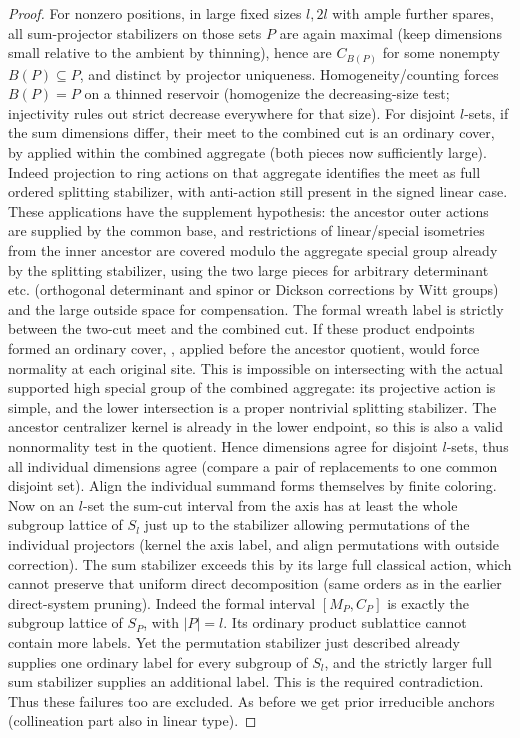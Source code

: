 \begin{proof}
For nonzero positions, in large fixed sizes \(l,2l\) with ample further spares, all sum-projector
stabilizers on those sets \(P\) are again maximal (keep dimensions small relative to the ambient by
thinning), hence are \(C_{B(P)}\) for some nonempty \(B(P)\subseteq P\), and distinct by projector
uniqueness. Homogeneity/counting forces \(B(P)=P\) on a thinned reservoir (homogenize the decreasing-size
test; injectivity rules out strict decrease everywhere for that size). For disjoint \(l\)-sets, if the
sum dimensions differ, their meet to the combined cut is an ordinary cover, by
 applied within the combined aggregate (both pieces now sufficiently large).
Indeed projection to ring actions on that aggregate identifies the meet as full ordered splitting
stabilizer, with anti-action still present in the signed linear case. These applications have the
supplement hypothesis: the ancestor outer actions are supplied by the common base, and restrictions of
linear/special isometries from the inner ancestor are covered modulo the aggregate special group already
by the splitting stabilizer, using the two large pieces for arbitrary determinant etc. (orthogonal
determinant and spinor or Dickson corrections by Witt groups) and the large outside space for
compensation.  The formal wreath label is strictly between the two-cut
meet and the combined cut.  If these product endpoints formed an
ordinary cover, , applied before the ancestor
quotient, would force normality at each original site.  This is
impossible on intersecting with the actual supported high special
group of the combined aggregate: its projective action is simple,
and the lower intersection is a proper nontrivial splitting stabilizer.
The ancestor centralizer kernel is already in the lower endpoint,
so this is also a valid nonnormality test in the quotient.  Hence dimensions agree for
disjoint \(l\)-sets, thus all individual dimensions agree (compare a pair of replacements to one common
disjoint set). Align the individual summand forms themselves by finite coloring. Now on an \(l\)-set the
sum-cut interval from the axis has at least the whole subgroup lattice of \(S_l\) just up to the
stabilizer allowing permutations of the individual projectors (kernel the axis label, and align
permutations with outside correction). The sum stabilizer exceeds this by its large full classical
action, which cannot preserve that uniform direct decomposition (same orders as in the earlier
direct-system pruning). Indeed the formal interval \([M_P,C_P]\) is exactly the subgroup lattice of
\(S_P\), with \(|P|=l\).  Its ordinary product sublattice cannot contain more labels.  Yet the
permutation stabilizer just described already supplies one ordinary label for every subgroup of \(S_l\),
and the strictly larger full sum stabilizer supplies an additional label.  This is the required
contradiction.  Thus these failures too are excluded. As
before we get prior irreducible anchors (collineation part also in linear type).

\end{proof}

